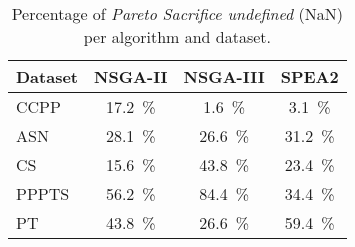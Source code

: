 \begin{table}[ht]
\centering
\caption{Percentage of \textit{Pareto Sacrifice undefined} (NaN) per algorithm and dataset.}
\label{tab:pareto_sacrifice_undefined_nsga-iinsga-iiispea2}
\begin{tabular}{lccc}
\hline
Dataset & NSGA-II & NSGA-III & SPEA2 \\
\hline
CCPP & 17.2~\% & 1.6~\% & 3.1~\% \\
ASN & 28.1~\% & 26.6~\% & 31.2~\% \\
CS & 15.6~\% & 43.8~\% & 23.4~\% \\
PPPTS & 56.2~\% & 84.4~\% & 34.4~\% \\
PT & 43.8~\% & 26.6~\% & 59.4~\% \\
\hline
\end{tabular}
\end{table}